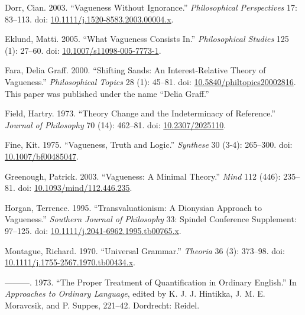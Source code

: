 \documentclass[
  11pt,
  letterpaper,
  DIV=11,
  numbers=noendperiod,
  twoside]{scrartcl}
\newlength{\cslhangindent}
\newenvironment{CSLReferences}[2] %
 {\begin{list}{}{%
  \setlength{\itemindent}{0pt}
  \setlength{\leftmargin}{0pt}
  \setlength{\parsep}{0pt}
  \ifodd #1
   \setlength{\leftmargin}{\cslhangindent}
   \setlength{\itemindent}{-1\cslhangindent}
  \fi
  \setlength{\itemsep}{#2\baselineskip}}}
 {\end{list}}
\begin{document}
\label{refs}
\begin{CSLReferences}{1}{0}
Dorr, Cian. 2003. {``Vagueness Without Ignorance.''} \emph{Philosophical
Perspectives} 17: 83--113. doi:
\href{https://doi.org/10.1111/j.1520-8583.2003.00004.x}{10.1111/j.1520-8583.2003.00004.x}.

Eklund, Matti. 2005. {``What Vagueness Consists In.''}
\emph{Philosophical Studies} 125 (1): 27--60. doi:
\href{https://doi.org/10.1007/s11098-005-7773-1}{10.1007/s11098-005-7773-1}.

Fara, Delia Graff. 2000. {``Shifting Sands: An Interest-Relative Theory
of Vagueness.''} \emph{Philosophical Topics} 28 (1): 45--81. doi:
\href{https://doi.org/10.5840/philtopics20002816}{10.5840/philtopics20002816}.
This paper was published under the name {``Delia Graff.''}

Field, Hartry. 1973. {``Theory Change and the Indeterminacy of
Reference.''} \emph{Journal of Philosophy} 70 (14): 462--81. doi:
\href{https://doi.org/10.2307/2025110}{10.2307/2025110}.

Fine, Kit. 1975. {``Vagueness, Truth and Logic.''} \emph{Synthese} 30
(3-4): 265--300. doi:
\href{https://doi.org/10.1007/bf00485047}{10.1007/bf00485047}.

Greenough, Patrick. 2003. {``Vagueness: A Minimal Theory.''} \emph{Mind}
112 (446): 235--81. doi:
\href{https://doi.org/10.1093/mind/112.446.235}{10.1093/mind/112.446.235}.

Horgan, Terrence. 1995. {``Transvaluationism: A Dionysian Approach to
Vagueness.''} \emph{Southern Journal of Philosophy} 33: Spindel
Conference Supplement: 97--125. doi:
\href{https://doi.org/10.1111/j.2041-6962.1995.tb00765.x}{10.1111/j.2041-6962.1995.tb00765.x}.

Montague, Richard. 1970. {``Universal Grammar.''} \emph{Theoria} 36 (3):
373--98. doi:
\href{https://doi.org/10.1111/j.1755-2567.1970.tb00434.x}{10.1111/j.1755-2567.1970.tb00434.x}.

---------. 1973. {``The Proper Treatment of Quantification in Ordinary
English.''} In \emph{Approaches to Ordinary Language}, edited by K. J.
J. Hintikka, J. M. E. Moravcsik, and P. Suppes, 221--42. Dordrecht:
Reidel.


\end{CSLReferences}
\end{document}

